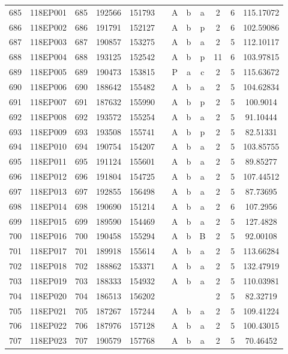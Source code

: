 \begin{tabular}{|*{12}{c|}}
685 & 118EP001 & 685 & 192566 & 151793 &  & A & b & a & 2 & 6 & 115.17072 \\ 
686 & 118EP002 & 686 & 191791 & 152127 &  & A & b & p & 2 & 6 & 102.59086 \\ 
687 & 118EP003 & 687 & 190857 & 153275 &  & A & b & a & 2 & 5 & 112.10117 \\ 
688 & 118EP004 & 688 & 193125 & 152542 &  & A & b & p & 11 & 6 & 103.97815 \\ 
689 & 118EP005 & 689 & 190473 & 153815 &  & P & a & c & 2 & 5 & 115.63672 \\ 
690 & 118EP006 & 690 & 188642 & 155482 &  & A & b & a & 2 & 5 & 104.62834 \\ 
691 & 118EP007 & 691 & 187632 & 155990 &  & A & b & p & 2 & 5 & 100.9014 \\ 
692 & 118EP008 & 692 & 193572 & 155254 &  & A & b & a & 2 & 5 & 91.10444 \\ 
693 & 118EP009 & 693 & 193508 & 155741 &  & A & b & p & 2 & 5 & 82.51331 \\ 
694 & 118EP010 & 694 & 190754 & 154207 &  & A & b & a & 2 & 5 & 103.85755 \\ 
695 & 118EP011 & 695 & 191124 & 155601 &  & A & b & a & 2 & 5 & 89.85277 \\ 
696 & 118EP012 & 696 & 191804 & 154725 &  & A & b & a & 2 & 5 & 107.44512 \\ 
697 & 118EP013 & 697 & 192855 & 156498 &  & A & b & a & 2 & 5 & 87.73695 \\ 
698 & 118EP014 & 698 & 190690 & 151214 &  & A & b & a & 2 & 6 & 107.2956 \\ 
699 & 118EP015 & 699 & 189590 & 154469 &  & A & b & a & 2 & 5 & 127.4828 \\ 
700 & 118EP016 & 700 & 190458 & 155294 &  & A & b & B & 2 & 5 & 92.00108 \\ 
701 & 118EP017 & 701 & 189918 & 155614 &  & A & b & a & 2 & 5 & 113.66284 \\ 
702 & 118EP018 & 702 & 188862 & 153371 &  & A & b & a & 2 & 5 & 132.47919 \\ 
703 & 118EP019 & 703 & 188333 & 154932 &  & A & b & a & 2 & 5 & 110.03981 \\ 
704 & 118EP020 & 704 & 186513 & 156202 &  &  &  &  & 2 & 5 & 82.32719 \\ 
705 & 118EP021 & 705 & 187267 & 157244 &  & A & b & a & 2 & 5 & 109.41224 \\ 
706 & 118EP022 & 706 & 187976 & 157128 &  & A & b & a & 2 & 5 & 100.43015 \\ 
707 & 118EP023 & 707 & 190579 & 157768 &  & A & b & a & 2 & 5 & 70.46452 \\ 

\end{tabular}
